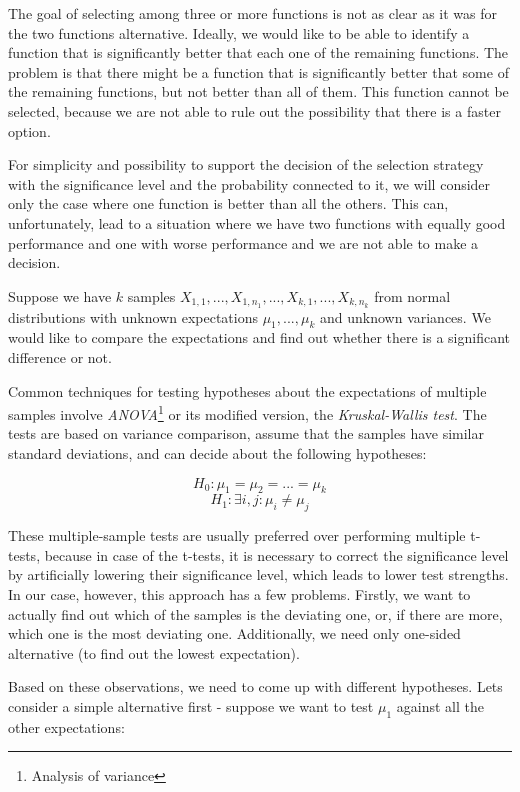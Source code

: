 The goal of selecting among three or more functions is not as clear as it was for the two functions alternative. Ideally, we would like to be able to identify a function that is significantly better that each one of the remaining functions. The problem is that there might be a function that is significantly better that some of the remaining functions, but not better than all of them. This function cannot be selected, because we are not able to rule out the 
possibility that there is a faster option.

For simplicity and possibility to support the decision of the selection strategy with the significance level and the probability connected to it, we will consider only the case where one function is better than all the others. This can, unfortunately, lead to a situation where we have two functions with equally good performance and one with worse performance and we are not able to make a decision.

Suppose we have $k$ samples $X_{1,1}, ..., X_{1, n_1}, ..., X_{k,1}, ..., X_{k, n_k}$ from normal distributions with unknown expectations $\mu_1, ..., \mu_k$ and unknown variances. We would like to compare the expectations and find out whether there is a significant difference or not.

Common techniques for testing hypotheses about the expectations of multiple samples involve \textit{ANOVA}\footnote{Analysis of variance} or its modified version, the \textit{Kruskal-Wallis test}. The tests are based on variance comparison, assume that the samples have similar standard deviations, and can decide about the following hypotheses:


\[
H_0: \mu_1 = \mu_2 = ... = \mu_k
\]
\[
H_1: \exists i, j: \mu_i \neq \mu_j
\]

These multiple-sample tests are usually preferred over performing multiple t-tests, because in case of the t-tests, it is necessary to correct the significance level by artificially lowering their significance level, which leads to lower test strengths. In our case, however, this approach has a few problems. Firstly, we want to actually find out which of the samples is the deviating one, or, if there are more, which one is the most deviating one. Additionally, we need only one-sided alternative (to find out the lowest expectation). 

Based on these observations, we need to come up with different hypotheses. Lets consider a simple alternative first - suppose we want to test $\mu_1$ against all the other expectations:

